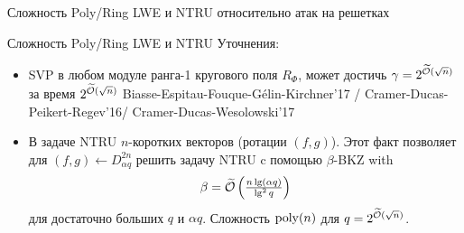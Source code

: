 \documentclass[usenames,dvipsnames, 9pt]{beamer}
\begin{document}
\begin{frame}{Сложность Poly/Ring LWE и NTRU относительно атак на решетках}
	
\end{frame}


\begin{frame}{Сложность Poly/Ring LWE и NTRU} 
	\Large
	Уточнения:
	\begin{itemize}
		\setlength\itemsep{7pt}
		\item  SVP в любом модуле {\color{Orange}ранга-1} кругового поля $R_\Phi$, может достичь $\gamma = 2^{\widetilde{\mathcal{O}}(\sqrt{n})}$ за время $2^{\widetilde{\mathcal{O}}(\sqrt{n})}$ Biasse-Espitau-Fouque-G{\'e}lin-Kirchner'17 / Cramer-Ducas-Peikert-Regev'16/ Cramer-Ducas-Wesolowski'17
		\pause
		\item  В задаче NTRU $n$-коротких векторов (ротации $(f,g)$). Этот факт позволяет для  $(f,g)\leftarrow D_{\alpha q}^{2n}$ решить задачу NTRU c помощью $\beta$-BKZ with
		\[
		\beta = \widetilde{\mathcal{O}}\left(  \tfrac{n \lg (\alpha q)}{\lg^2  q} \right)
		\]
		для достаточно больших $q$ и $\alpha q$. Сложность $\mathrm{poly}(n)$ для $q = 2^{\widetilde{\mathcal{O}}(\sqrt{n})}$.
	\end{itemize}
	
	
\end{frame}
\end{document}
